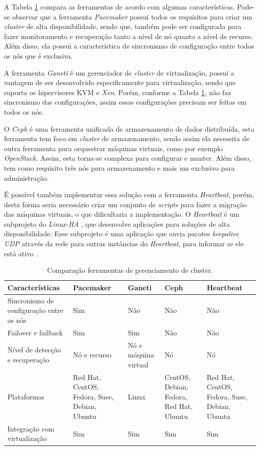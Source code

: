 A Tabela \ref{tab:clusterger} compara as ferramentas de acordo com algumas características. Pode-se observar que a ferramenta \textit{Pacemaker}
possui todos os requisitos para criar um \textit{cluster} de alta disponibilidade, sendo que, também pode ser configurada para fazer monitoramento 
e recuperação tanto a nível de nó quanto a nível de recurso. Além disso, ela possui a característica de sincronismo de configuração entre todos
os nós que é exclusiva.

A ferramenta \textit{Ganeti} é um gerenciador de \textit{cluster} de virtualização, possui a vantagem de ser desenvolvido especificamente para
virtualização, sendo que suporta os hipervisores \ac{KVM} e \textit{Xen}. Porém, conforme a Tabela \ref{tab:clusterger}, não faz sincronismo
das configurações, assim essas configurações precisam ser feitas em todos os nós.

O \textit{Ceph} é uma ferramenta unificada de armazenamento de dados distribuída, esta ferramenta tem foco em \textit{cluster} de armazenamento, 
sendo assim ela necessita de outra ferramenta para orquestrar máquinas virtuais, como por exemplo \textit{OpenStack}. Assim, esta torna-se 
complexa para configurar e manter. Além disso, tem como requisito três nós para armazenamento e mais um exclusivo para administração.

É possível também implementar essa solução com a ferramenta \textit{Heartbeat}, porém, desta forma seria necessário criar um conjunto de 
\textit{scripts} para fazer a migração das máquinas virtuais, o que dificultaria a implementação.
O \textit{Heartbeat} é um subprojeto do \textit{Linux-HA} \cite{linuxha}, que desenvolve aplicações para soluções de alta disponibilidade.
Esse subprojeto é uma aplicação que envia pacotes \textit{keepalive \ac{UDP}} através da rede para outras instâncias do \textit{Heartbeat}, para
informar se ele está ativo \cite{reis2009}.

\begin{table}[h!]
\caption{Comparação ferramentas de gerenciamento de cluster.}
\label{tab:clusterger}
\begin{center}
\begin{tabular}{|p{3.5cm}|p{2.7cm}|p{2cm}|p{2.7cm}|p{2.7cm}|}\hline
Características & Pacemaker & Ganeti & Ceph & Heartbeat \\\hline
Sincronismo de configuração entre os nós & Sim & Não & Não & Não \\\hline
Failover e failback & Sim & Sim & Não & Não \\\hline
Nível de detecção e recuperação & Nó e recurso & Nó e máquina virtual & Nó & Nó \\\hline
Plataformas & Red Hat, CentOS, Fedora, Suse, Debian, Ubuntu & Linux & CentOS, Debian, Fedora, Red Hat, Ubuntu & Red Hat, CentOS, Fedora, Suse, Debian, Ubuntu \\\hline
Integração com virtualização & Sim & Sim & Sim & Sim \\\hline
\end{tabular}
\end{center}
\end{table}

